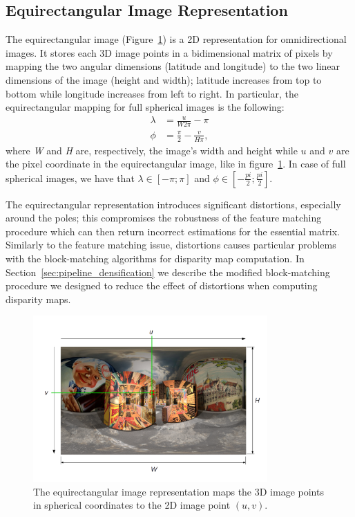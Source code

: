 \subsection{Equirectangular Image Representation}
\label{subsec:image_format}
The equirectangular image (Figure~\ref{fig:equirectangular}) is a 2D
representation for omnidirectional 
images. It stores each 3D image points in a bidimensional matrix of pixels
by mapping the two angular dimensions (latitude and longitude) to the two
linear dimensions of the image (height and width); latitude increases from 
top to bottom while longitude increases from left to right.
In particular, the equirectangular mapping for full spherical images is the
following:
%
\begin{subequations}
	\label{eq:ll2Cartesian_first}
	\begin{align}
	\lambda &= \frac{u}{W 2 \pi} - \pi \\
	\phi &= \frac{\pi}{2} - \frac{v}{H \pi}\text{,}
	\end{align}
\end{subequations}
%
\noindent where \textit{W} and \textit{H} are, respectively, 
the image's width and height while $u$ and $v$ are the pixel coordinate 
in the equirectangular image, like in figure~\ref{fig:equirectangular}.
In case of full spherical images, we have that
$ \lambda \in [-\pi; \pi] $ and $\phi \in [-\frac{pi}{2}; \frac{pi}{2}] $.

The equirectangular representation introduces significant distortions, especially 
around the poles; this compromises the robustness of the feature matching 
procedure which can then return incorrect estimations for the essential 
matrix.
Similarly to the feature matching issue, distortions causes particular problems
with the block-matching algorithms for disparity map computation.
In Section~\ref{sec:pipeline_densification} we describe the modified 
block-matching procedure we designed to reduce the effect of distortions 
when computing disparity maps.

\begin{figure}[h]
	\centering
	\includegraphics[width=0.8\textwidth]{img/equirectangular}
	\caption{The equirectangular image representation maps the 3D image points in 
	spherical coordinates to the 2D image point $(u, v)$.}
	\label{fig:equirectangular}
\end{figure}

